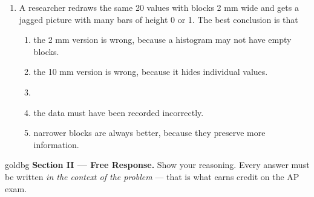 \documentclass[12pt]{article}
\begin{document}
\begin{enumerate}[leftmargin=1.9em, itemsep=0.13in]
  \item A researcher redraws the same 20 values with blocks 2 mm wide and gets a jagged picture
        with many bars of height 0 or 1. The best conclusion is that
        \begin{enumerate}[label=\textbf{(\Alph*)}, leftmargin=2.2em, itemsep=2pt]
          \item the 2 mm version is wrong, because a histogram may not have empty blocks.
          \item the 10 mm version is wrong, because it hides individual values.
          \item {}
          \item the data must have been recorded incorrectly.
                \hfill{}
          \item narrower blocks are always better, because they preserve more information.
        \end{enumerate}

\end{enumerate}

\vspace{0.14in}

\boxguard[16]
\begin{headlinebox}{goldbg}
\small
\textbf{Section II --- Free Response.} Show your reasoning. Every answer must be written
\emph{in the context of the problem} --- that is what earns credit on the AP exam.
\end{headlinebox}

\vspace{0.10in}
\end{document}
